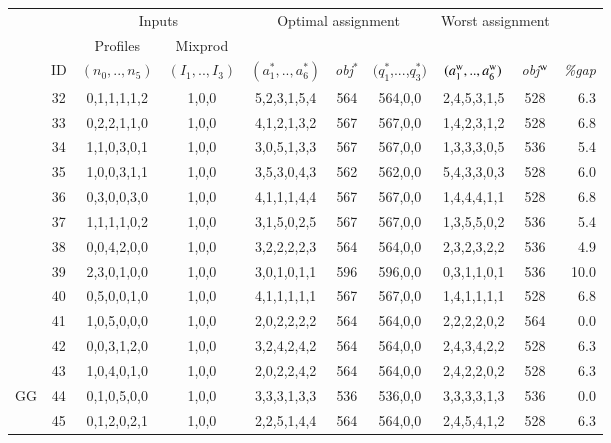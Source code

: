 \documentclass[review,12pt, 3p, times]{elsarticle}
\begin{document}
\begin{longtable}{|c|c|c|c|c|c|c|c|c|r|}
	\hline
	& & \multicolumn{2}{c|}{Inputs} & \multicolumn{3}{c|}{Optimal assignment} & \multicolumn{2}{c|}{Worst assignment }& \\
	& \multicolumn{1}{c|}{ } & \multicolumn{1}{c|}{Profiles} & \multicolumn{1}{c|}{Mixprod}& \multicolumn{1}{c}{}  & \multicolumn{2}{c|}{} & \multicolumn{2}{c|}{}&\multicolumn{1}{c|}{}\\
	& ID & \multicolumn{1}{c|}{$(n_0,..,n_5)$} & \multicolumn{1}{c|}{$(I_1,..,I_3)$} & {$(a^*_1,..,a^*_6)$} & \it{obj}$^*$ & $(q^*_1$,...,$q^*_3)$ & {$(a^{\textsc{w}}_1,..,a^{\textsc{w}}_6)$} & \it{obj}$^{\textsc{w}}$ & \it{\%gap}    \\ %
	\hline
    & 32 & 0,1,1,1,1,2 & 1,0,0 &5,2,3,1,5,4 & 564 & 564,0,0 & 2,4,5,3,1,5 & 528 & 6.3 \\
    & 33 & 0,2,2,1,1,0 & 1,0,0 &4,1,2,1,3,2 & 567 & 567,0,0 & 1,4,2,3,1,2 & 528 & 6.8  \\
    & 34 & 1,1,0,3,0,1 & 1,0,0 &3,0,5,1,3,3 & 567 & 567,0,0 & 1,3,3,3,0,5 & 536 & 5.4  \\
    & 35 & 1,0,0,3,1,1 & 1,0,0 & 3,5,3,0,4,3 & 562 & 562,0,0 & 5,4,3,3,0,3 & 528 & 6.0   \\ 
    & 36 & 0,3,0,0,3,0 & 1,0,0 &4,1,1,1,4,4 & 567 & 567,0,0 & 1,4,4,4,1,1 & 528 & 6.8  \\
    & 37 & 1,1,1,1,0,2 & 1,0,0 &3,1,5,0,2,5 & 567 & 567,0,0 & 1,3,5,5,0,2 & 536 & 5.4  \\
    & 38 & 0,0,4,2,0,0 & 1,0,0 &3,2,2,2,2,3 & 564 & 564,0,0 & 2,3,2,3,2,2 & 536 & 4.9  \\
    & 39 & 2,3,0,1,0,0 & 1,0,0 &3,0,1,0,1,1 & 596 & 596,0,0 & 0,3,1,1,0,1 & 536 & 10.0 \\
    & 40 & 0,5,0,0,1,0 & 1,0,0 &4,1,1,1,1,1 & 567 & 567,0,0 & 1,4,1,1,1,1 & 528 & 6.8  \\
    & 41 & 1,0,5,0,0,0 & 1,0,0 &2,0,2,2,2,2 & 564 & 564,0,0 & 2,2,2,2,0,2 & 564 & 0.0  \\
    & 42 & 0,0,3,1,2,0 & 1,0,0 &3,2,4,2,4,2 & 564 & 564,0,0 & 2,4,3,4,2,2 & 528 & 6.3  \\
    & 43 & 1,0,4,0,1,0 & 1,0,0 &2,0,2,2,4,2 & 564 & 564,0,0 & 2,4,2,2,0,2 & 528 & 6.3  \\
    {GG}\label{SEN:GG} & 44 & 0,1,0,5,0,0 & 1,0,0 &3,3,3,1,3,3 & 536 & 536,0,0 & 3,3,3,3,1,3 & 536 & 0.0  \\
    & 45 & 0,1,2,0,2,1 & 1,0,0 &2,2,5,1,4,4 & 564 & 564,0,0 & 2,4,5,4,1,2 & 528 & 6.3  \\

\end{longtable}
\end{document}
